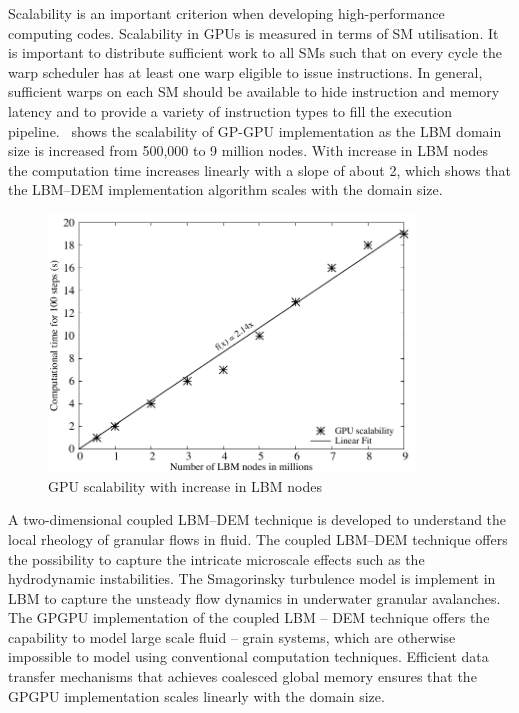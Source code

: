Scalability is an important criterion when developing high-performance 
computing codes. Scalability in GPUs is measured in terms of SM utilisation. It 
is important to distribute sufficient work to all SMs such that on every cycle 
the warp scheduler has at least one warp eligible to issue instructions. In 
general, sufficient warps on each SM should be available to hide instruction 
and memory latency and to provide a variety of instruction types to 
fill the execution pipeline.~ shows the scalability of 
GP-GPU implementation as the LBM domain size is increased from 500,000 to 9 
million nodes. With increase in LBM nodes the computation time increases 
linearly with a slope of about 2, which shows that the LBM--DEM implementation 
algorithm scales with the domain size.

\begin{figure}[tbhp]
	\centering
	\includegraphics[width=0.87\textwidth]{GPU_Speedup}
	\caption{GPU scalability with increase in LBM nodes}
	\label{fig:GPUSpeed}
\end{figure}

A two-dimensional coupled LBM--DEM technique is developed to understand the 
local rheology of granular flows in fluid. The coupled LBM--DEM technique 
offers the possibility to capture the intricate microscale effects such as the 
hydrodynamic instabilities. The Smagorinsky turbulence model is implement in 
LBM to capture the unsteady flow dynamics in underwater granular avalanches. 
The GPGPU implementation of the coupled LBM -- DEM technique offers the 
capability to model large scale fluid -- grain systems, which are otherwise 
impossible to model using conventional computation techniques. Efficient data 
transfer mechanisms that achieves coalesced global memory ensures that the 
GPGPU implementation scales linearly with the domain size.
